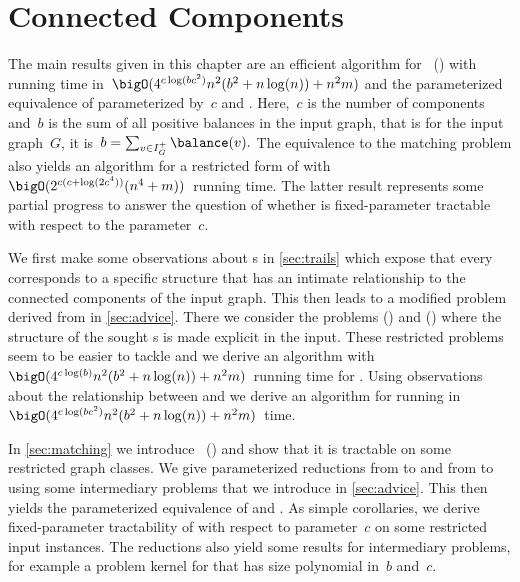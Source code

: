 \chapter{Connected Components}\label{sec:conncomp}
The main results given in this chapter are an efficient algorithm for \pWMEE{}~(\pWMEEs{}) with running time in~$\bigO(4^{c\log(bc^2)}n^2(b^2 + n\log(n)) + n^2m)$ and the parameterized equivalence of \pWMEEs{} parameterized by~$c$ and \pCBM{}. Here,~$c$ is the number of components and~$b$ is the sum of all positive balances in the input graph, that is for the input graph~$G$, it is~$b = \sum_{v \in I_G^+}\balance(v)\text{.}$ The equivalence to the matching problem also yields an algorithm for a restricted form of \pWMEEs{} with~$\bigO(2^{c(c + \log(2c^4))}(n^4 + m))$~running time. The latter result represents some partial progress to answer the question of whether \pWMEEs{} is fixed-parameter tractable with respect to the parameter~$c$.

We first make some observations about \EE s in \autoref{sec:trails} which expose that every \EE{} corresponds to a specific structure that has an intimate relationship to the connected components of the input graph. This then leads to a modified problem derived from \pWMEEs{} in \autoref{sec:advice}. There we consider the problems \pWMEEA{} (\pWMEEAs{}) and \pWMEECA{} (\pWMEECAs) where the structure of the sought \EE s is made explicit in the input. These restricted problems seem to be easier to tackle and we derive an algorithm with~$\bigO(4^{c\log(b)}n^2(b^2+ n\log(n)) + n^2m)$~running time for \pWMEECAs{}. Using observations about the relationship between \pWMEEs{} and \pWMEECAs{} we derive an algorithm for \pWMEEs{} running in~$\bigO(4^{c\log(bc^2)}n^2(b^2 + n\log(n)) + n^2m)$~time.

In \autoref{sec:matching} we introduce \pCBM{}~(\pCBMs{}) and show that it is tractable on some restricted graph classes. We give parameterized reductions from \pWMEEs{} to \pCBMs{} and from \pCBMs{} to \pWMEEs{} using some intermediary problems that we introduce in \autoref{sec:advice}. This then yields the parameterized equivalence of \pCBMs{} and \pWMEEs{}. As simple corollaries, we derive fixed-parameter tractability of \pWMEEs{} with respect to parameter~$c$ on some restricted input instances. The reductions also yield some results for intermediary problems, for example a problem kernel for \pWMEECAs{} that has size polynomial in~$b$ and~$c$.

